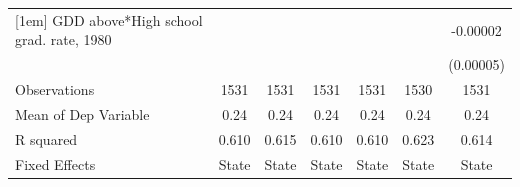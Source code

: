 {\begin{tabular*}{\hsize}{@{\hskip\tabcolsep\extracolsep\fill}l*{6}{c}}
[1em]
GDD above*High school grad. rate, 1980&                  &                  &                  &                  &                  & -0.00002         \\
                &                  &                  &                  &                  &                  &(0.00005)         \\
\hline
Observations    &     1531         &     1531         &     1531         &     1531         &     1530         &     1531         \\
Mean of Dep Variable&     0.24         &     0.24         &     0.24         &     0.24         &     0.24         &     0.24         \\
R squared       &    0.610         &    0.615         &    0.610         &    0.610         &    0.623         &    0.614         \\
Fixed Effects   &    State         &    State         &    State         &    State         &    State         &    State         \\
\hline\hline
\end{tabular*}
}
